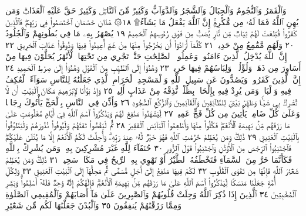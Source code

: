 وَٱلْقَمَرُ وَٱلنُّجُومُ وَٱلْجِبَالُ وَٱلشَّجَرُ وَٱلدَّوَآبُّ وَكَثِيرࣱ مِّنَ
ٱلنَّاسِۖ وَكَثِيرٌ حَقَّ عَلَيْهِ ٱلْعَذَابُۗ وَمَن يُهِنِ ٱللَّهُ فَمَا لَهُۥ مِن
مُّكْرِمٍۚ إِنَّ ٱللَّهَ يَفْعَلُ مَا يَشَآءُ۩ ١٨۞ هَٰذَانِ خَصْمَانِ
ٱخْتَصَمُوا۟ فِي رَبِّهِمْۖ فَٱلَّذِينَ كَفَرُوا۟ قُطِّعَتْ لَهُمْ ثِيَابࣱ
مِّن نَّارࣲ يُصَبُّ مِن فَوْقِ رُءُوسِهِمُ ٱلْحَمِيمُ ١٩ يُصْهَرُ بِهِۦ
مَا فِي بُطُونِهِمْ وَٱلْجُلُودُ ٢٠ وَلَهُم مَّقَٰمِعُ مِنْ حَدِيدࣲ ٢١ كُلَّمَآ
أَرَادُوٓا۟ أَن يَخْرُجُوا۟ مِنْهَا مِنْ غَمٍّ أُعِيدُوا۟ فِيهَا وَذُوقُوا۟ عَذَابَ
ٱلْحَرِيقِ ٢٢ إِنَّ ٱللَّهَ يُدْخِلُ ٱلَّذِينَ ءَامَنُوا۟ وَعَمِلُوا۟ ٱلصَّٰلِحَٰتِ
جَنَّٰتࣲ تَجْرِي مِن تَحْتِهَا ٱلْأَنْهَٰرُ يُحَلَّوْنَ فِيهَا مِنْ
أَسَاوِرَ مِن ذَهَبࣲ وَلُؤْلُؤࣰاۖ وَلِبَاسُهُمْ فِيهَا حَرِيرࣱ ٢٣
وَهُدُوٓا۟ إِلَى ٱلطَّيِّبِ مِنَ ٱلْقَوْلِ وَهُدُوٓا۟ إِلَىٰ صِرَٰطِ ٱلْحَمِيدِ ٢٤
إِنَّ ٱلَّذِينَ كَفَرُوا۟ وَيَصُدُّونَ عَن سَبِيلِ ٱللَّهِ وَٱلْمَسْجِدِ
ٱلْحَرَامِ ٱلَّذِي جَعَلْنَٰهُ لِلنَّاسِ سَوَآءً ٱلْعَٰكِفُ فِيهِ وَٱلْبَادِۚ
وَمَن يُرِدْ فِيهِ بِإِلْحَادِۭ بِظُلْمࣲ نُّذِقْهُ مِنْ عَذَابٍ أَلِيمࣲ ٢٥
وَإِذْ بَوَّأْنَا لِإِبْرَٰهِيمَ مَكَانَ ٱلْبَيْتِ أَن لَّا تُشْرِكْ
بِي شَيْـࣰٔا وَطَهِّرْ بَيْتِيَ لِلطَّآئِفِينَ وَٱلْقَآئِمِينَ وَٱلرُّكَّعِ
ٱلسُّجُودِ ٢٦ وَأَذِّن فِي ٱلنَّاسِ بِٱلْحَجِّ يَأْتُوكَ رِجَالࣰا وَعَلَىٰ
كُلِّ ضَامِرࣲ يَأْتِينَ مِن كُلِّ فَجٍّ عَمِيقࣲ ٢٧ لِّيَشْهَدُوا۟
مَنَٰفِعَ لَهُمْ وَيَذْكُرُوا۟ ٱسْمَ ٱللَّهِ فِيٓ أَيَّامࣲ مَّعْلُومَٰتٍ
عَلَىٰ مَا رَزَقَهُم مِّنۢ بَهِيمَةِ ٱلْأَنْعَٰمِۖ فَكُلُوا۟ مِنْهَا
وَأَطْعِمُوا۟ ٱلْبَآئِسَ ٱلْفَقِيرَ ٢٨ ثُمَّ لْيَقْضُوا۟ تَفَثَهُمْ
وَلْيُوفُوا۟ نُذُورَهُمْ وَلْيَطَّوَّفُوا۟ بِٱلْبَيْتِ ٱلْعَتِيقِ ٢٩
ذَٰلِكَۖ وَمَن يُعَظِّمْ حُرُمَٰتِ ٱللَّهِ فَهُوَ خَيْرࣱ لَّهُۥ عِندَ
رَبِّهِۦۗ وَأُحِلَّتْ لَكُمُ ٱلْأَنْعَٰمُ إِلَّا مَا يُتْلَىٰ عَلَيْكُمْۖ
فَٱجْتَنِبُوا۟ ٱلرِّجْسَ مِنَ ٱلْأَوْثَٰنِ وَٱجْتَنِبُوا۟ قَوْلَ ٱلزُّورِ ٣٠
حُنَفَآءَ لِلَّهِ غَيْرَ مُشْرِكِينَ بِهِۦۚ وَمَن يُشْرِكْ بِٱللَّهِ فَكَأَنَّمَا خَرَّ مِنَ
ٱلسَّمَآءِ فَتَخْطَفُهُ ٱلطَّيْرُ أَوْ تَهْوِي بِهِ ٱلرِّيحُ فِي مَكَانࣲ سَحِيقࣲ ٣١
ذَٰلِكَۖ وَمَن يُعَظِّمْ شَعَٰٓئِرَ ٱللَّهِ فَإِنَّهَا مِن تَقْوَى ٱلْقُلُوبِ ٣٢
لَكُمْ فِيهَا مَنَٰفِعُ إِلَىٰٓ أَجَلࣲ مُّسَمࣰّى ثُمَّ مَحِلُّهَآ إِلَى ٱلْبَيْتِ
ٱلْعَتِيقِ ٣٣ وَلِكُلِّ أُمَّةࣲ جَعَلْنَا مَنسَكࣰا لِّيَذْكُرُوا۟ ٱسْمَ ٱللَّهِ عَلَىٰ
مَا رَزَقَهُم مِّنۢ بَهِيمَةِ ٱلْأَنْعَٰمِۗ فَإِلَٰهُكُمْ إِلَٰهࣱ وَٰحِدࣱ فَلَهُۥٓ
أَسْلِمُوا۟ۗ وَبَشِّرِ ٱلْمُخْبِتِينَ ٣٤ ٱلَّذِينَ إِذَا ذُكِرَ ٱللَّهُ وَجِلَتْ
قُلُوبُهُمْ وَٱلصَّٰبِرِينَ عَلَىٰ مَآ أَصَابَهُمْ وَٱلْمُقِيمِي ٱلصَّلَوٰةِ
وَمِمَّا رَزَقْنَٰهُمْ يُنفِقُونَ ٣٥ وَٱلْبُدْنَ جَعَلْنَٰهَا لَكُم مِّن شَعَٰٓئِرِ
